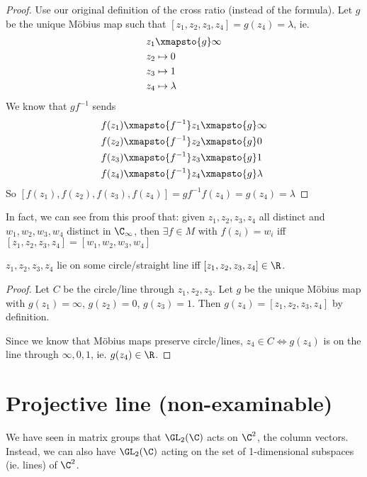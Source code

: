 \documentclass[a4paper]{article}
\begin{document}
\begin{proof}
  Use our original definition of the cross ratio (instead of the formula). Let $g$ be the unique M\"obius map such that $[z_1, z_2, z_3, z_4] = g(z_4) = \lambda$, ie.
  \begin{align*}
    z_1 &\xmapsto{g} \infty\\
    z_2 &\mapsto 0\\
    z_3 &\mapsto 1\\
    z_4 &\mapsto \lambda
  \end{align*}
  We know that $gf^{-1}$ sends
  \begin{align*}
    f(z_1)\xmapsto{f^{-1}} z_1 &\xmapsto{g} \infty\\
    f(z_2)\xmapsto{f^{-1}} z_2 &\xmapsto{g} 0\\
    f(z_3)\xmapsto{f^{-1}} z_3 &\xmapsto{g} 1\\
    f(z_4)\xmapsto{f^{-1}} z_4 &\xmapsto{g} \lambda
  \end{align*}
  So $[f(z_1), f(z_2), f(z_3), f(z_4)] = gf^{-1}f(z_4) = g(z_4) = \lambda$
\end{proof}

In fact, we can see from this proof that: given $z_1, z_2, z_3, z_4$ all distinct and $w_1, w_2, w_3, w_4$ distinct in $\C_\infty$, then $\exists f\in M$ with $f(z_i) = w_i$ iff $[z_1, z_2, z_3, z_4] = [w_1, w_2, w_3, w_4]$

\begin{cor}
  $z_1, z_2, z_3, z_4$ lie on some circle/straight line iff $[z_1, z_2, z_3, z_4]\in \R$.
\end{cor}

\begin{proof}
  Let $C$ be the circle/line through $z_1, z_2, z_3$. Let $g$ be the unique M\"obius map with $g(z_1) = \infty$, $g(z_2) = 0$, $g(z_3) = 1$. Then $g(z_4) = [z_1, z_2, z_3, z_4]$ by definition.

  Since we know that M\"obius maps preserve circle/lines, $z_4\in C \Leftrightarrow g(z_4)$ is on the line through $\infty, 0, 1$, ie. $g(z_4) \in \R$.
\end{proof}

\section{Projective line (non-examinable)}
We have seen in matrix groups that $\GL_2(\C)$ acts on $\C^2$, the column vectors. Instead, we can also have $\GL_2(\C)$ acting on the set of 1-dimensional subspaces (ie. lines) of $\C^2$.
\end{document}
